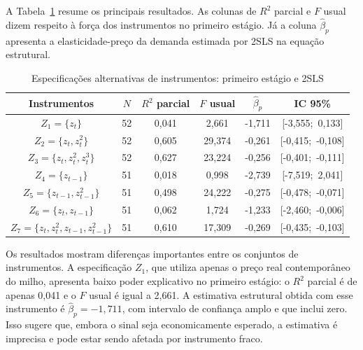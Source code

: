 \documentclass[12pt,a4paper]{article}
\begin{document}
\begin{enumerate}[label=\textbf{\arabic*.}]
A Tabela~\ref{tab:q8_instrumentos_alt} resume os principais resultados. As colunas de $R^2$ parcial e $F$ usual dizem respeito à força dos instrumentos no primeiro estágio. Já a coluna $\hat{\beta}_p$ apresenta a elasticidade-preço da demanda estimada por 2SLS na equação estrutural.

\begin{table}[H]
    \centering
    \caption{Especificações alternativas de instrumentos: primeiro estágio e 2SLS}
    \label{tab:q8_instrumentos_alt}
    \begin{tabular}{c c c c c c}
        \hline
        Instrumentos & $N$ & $R^2$ parcial & $F$ usual & $\hat{\beta}_p$ & IC 95\% \\
        \hline
        $Z_1=\{z_t\}$ 
        & 52 & 0{,}041 & 2{,}661 & -1{,}711 & [-3{,}555;\ 0{,}133] \\

        $Z_2=\{z_t,z_t^2\}$ 
        & 52 & 0{,}605 & 29{,}374 & -0{,}261 & [-0{,}415;\ -0{,}108] \\

        $Z_3=\{z_t,z_t^2,z_t^3\}$ 
        & 52 & 0{,}627 & 23{,}224 & -0{,}256 & [-0{,}401;\ -0{,}111] \\

        $Z_4=\{z_{t-1}\}$ 
        & 51 & 0{,}018 & 0{,}998 & -2{,}739 & [-7{,}519;\ 2{,}041] \\

        $Z_5=\{z_{t-1},z_{t-1}^2\}$ 
        & 51 & 0{,}498 & 24{,}222 & -0{,}275 & [-0{,}478;\ -0{,}071] \\

        $Z_6=\{z_t,z_{t-1}\}$ 
        & 51 & 0{,}062 & 1{,}724 & -1{,}233 & [-2{,}460;\ -0{,}006] \\

        $Z_7=\{z_t,z_t^2,z_{t-1},z_{t-1}^2\}$ 
        & 51 & 0{,}610 & 17{,}309 & -0{,}269 & [-0{,}435;\ -0{,}103] \\
        \hline
    \end{tabular}
\end{table}

Os resultados mostram diferenças importantes entre os conjuntos de instrumentos. A especificação $Z_1$, que utiliza apenas o preço real contemporâneo do milho, apresenta baixo poder explicativo no primeiro estágio: o $R^2$ parcial é de apenas 0{,}041 e o $F$ usual é igual a 2{,}661. A estimativa estrutural obtida com esse instrumento é $\hat{\beta}_p=-1{,}711$, com intervalo de confiança amplo e que inclui zero. Isso sugere que, embora o sinal seja economicamente esperado, a estimativa é imprecisa e pode estar sendo afetada por instrumento fraco.


\end{enumerate}
\end{document}
